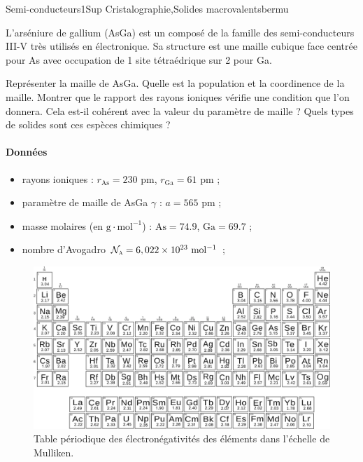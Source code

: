 \begin{exercise}{Semi-conducteurs}{1}{Sup}
{Cristalographie,Solides macrovalents}{bermu}

L'arséniure de gallium (AsGa) est un composé de la famille des semi-conducteurs III-V très utilisés en électronique. Sa structure est une maille cubique face centrée pour As avec occupation de 1 site tétraédrique sur 2 pour Ga.

\begin{questions}
    \question Représenter la maille de AsGa.
    \question Quelle est la population et la coordinence de la maille.
    \question Montrer que le rapport des rayons ioniques vérifie une condition que l'on donnera. Cela est-il cohérent avec la valeur du paramètre de maille ?
    \question Quels types de solides sont ces espèces chimiques ?
\end{questions}

\paragraph{Données}
\begin{itemize}
    \item rayons ioniques : $r_\text{As} = 230$ pm, $r_\text{Ga} = 61$ pm ;
    \item paramètre de maille de AsGa $\gamma$ : $a = 565$ pm ;
    \item masse molaires (en $\mathrm{g\cdot mol^{-1}}$) : $\text{As} = 74.9$, $\text{Ga} = 69.7$ ; 
    \item nombre d'Avogadro $\cal{N}_\textsc{a} = 6,022\times 10^{23}~\mathrm{mol^{-1}}$ ;
\end{itemize}

\begin{figure}[H]
    \centering
    \includegraphics[width=\linewidth]{chimie/cristallo/electroneg_mulliken.png}
    \caption{Table périodique des électronégativités des éléments dans l'échelle de Mulliken.}
\end{figure}
\end{exercise}

